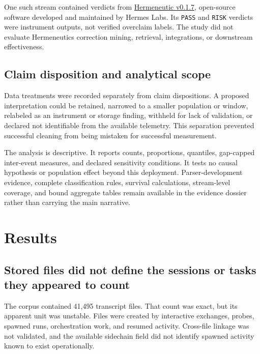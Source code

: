 \documentclass[12pt]{article}
\begin{document}
One such stream contained verdicts from \href{https://github.com/hermes-labs-ai/hermeneutic}{Hermeneutic v0.1.7}, open-source software developed and maintained by Hermes Labs. Its \texttt{PASS} and \texttt{RISK} verdicts were instrument outputs, not verified overclaim labels. The study did not evaluate Hermeneutic\textquotesingle s correction mining, retrieval, integrations, or downstream effectiveness.

\subsection{Claim disposition and analytical scope}\label{claim-disposition-and-analytical-scope}

Data treatments were recorded separately from claim dispositions. A proposed interpretation could be retained, narrowed to a smaller population or window, relabeled as an instrument or storage finding, withheld for lack of validation, or declared not identifiable from the available telemetry. This separation prevented successful cleaning from being mistaken for successful measurement.

The analysis is descriptive. It reports counts, proportions, quantiles, gap-capped inter-event measures, and declared sensitivity conditions. It tests no causal hypothesis or population effect beyond this deployment. Parser-development evidence, complete classification rules, survival calculations, stream-level coverage, and bound aggregate tables remain available in the evidence dossier rather than carrying the main narrative.

\section{Results}\label{results}

\subsection{Stored files did not define the sessions or tasks they appeared to count}\label{stored-files-did-not-define-the-sessions-or-tasks-they-appeared-to-count}

The corpus contained 41,495 transcript files. That count was exact, but its apparent unit was unstable. Files were created by interactive exchanges, probes, spawned runs, orchestration work, and resumed activity. Cross-file linkage was not validated, and the available sidechain field did not identify spawned activity known to exist operationally.
\end{document}
